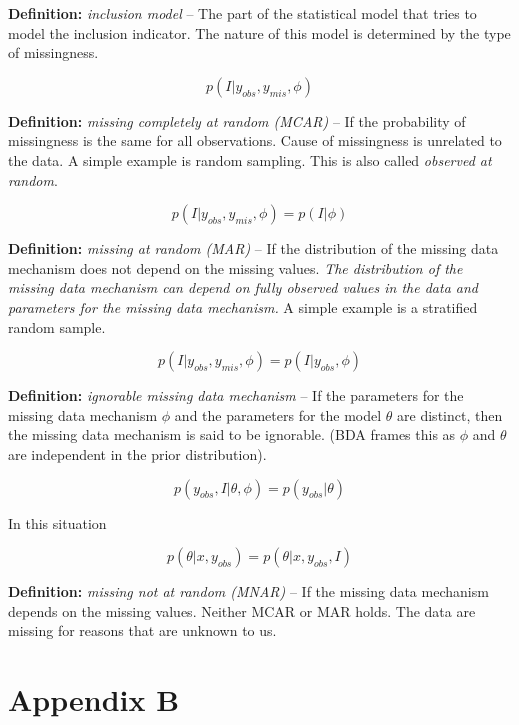 \documentclass[11pt]{article}
\begin{document}
\textbf{Definition:} \textit{inclusion model} -- The part of the statistical model that tries to model the inclusion indicator. The nature of this model is determined by the type of missingness. 

$$p(I|y_{obs}, y_{mis}, \phi)$$

\vspace{0.25in}

\textbf{Definition:} \textit{missing completely at random (MCAR)} -- If the probability of missingness is the same for all observations. Cause of missingness is unrelated to the data. A simple example is random sampling. This is also called \textit{observed at random}.

$$p(I|y_{obs}, y_{mis}, \phi) = p(I| \phi)$$

\vspace{0.25in}

\textbf{Definition:} \textit{missing at random (MAR)} -- If the distribution of the missing data mechanism does not depend on the missing values. \textit{The distribution of the missing data mechanism can depend on fully observed values in the data and parameters for the missing data mechanism.} A simple example is a stratified random sample. 

$$p(I|y_{obs}, y_{mis}, \phi) = p(I|y_{obs}, \phi)$$

\vspace{0.25in}

\textbf{Definition:} \textit{ignorable missing data mechanism} -- If the parameters for the missing data mechanism $\phi$ and the parameters for the model $\theta$ are distinct, then the missing data mechanism is said to be ignorable. (BDA frames this as $\phi$ and $\theta$ are independent in the prior distribution). 

$$p(y_{obs},I|\theta, \phi) = p(y_{obs}|\theta)$$

In this situation

$$p(\theta|x, y_{obs}) = p(\theta|x, y_{obs}, I)$$

\vspace{0.25in}

\textbf{Definition:} \textit{missing not at random (MNAR)} -- If the missing data mechanism depends on the missing values. Neither MCAR or MAR holds. The data are missing for reasons that are unknown to us. 

\vspace{0.5in}

\newpage
\section{Appendix B}
\end{document}
